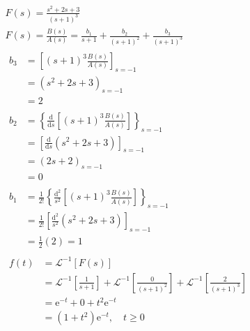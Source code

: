 \begin{gather*}
    F(s)=\frac{s^{2}+2 s+3}{(s+1)^{3}}\\
    F(s)=\frac{B(s)}{A(s)}=\frac{b_{1}}{s+1}+\frac{b_{2}}{(s+1)^{2}}+\frac{b_{3}}{(s+1)^{3}}\\
    \begin{aligned} b_{3} &=\left[(s+1)^{3} \frac{B(s)}{A(s)}\right]_{s=-1} \\ &=\left(s^{2}+2 s+3\right)_{s=-1} \\ &=2 \end{aligned}\\
    \begin{aligned} b_{2} &=\left\{\frac{\mathrm{d}}{\mathrm{d} s}\left[(s+1)^{3} \frac{B(s)}{A(s)}\right]\right\}_{s=-1} \\ &=\left[\frac{\mathrm{d}}{\mathrm{d} s}\left(s^{2}+2 s+3\right)\right]_{s=-1} \\ &=(2 s+2)_{s=-1} \\ &=0 \end{aligned}\\
    \begin{aligned} b_{1} &=\frac{1}{2 !}\left\{\frac{\mathrm{d}^{2}}{s^{2}}\left[(s+1)^{3} \frac{B(s)}{A(s)}\right]\right\}_{s=-1} \\ &=\frac{1}{2 !}\left[\frac{\mathrm{d}^{2}}{s^{2}}\left(s^{2}+2 s+3\right)\right]_{s=-1} \\ &=\frac{1}{2}(2)=1 \end{aligned}\\
    \begin{aligned} f(t) &=\mathscr{L}^{-1}[F(s)] \\ &=\mathscr{L}^{-1}\left[\frac{1}{s+1}\right]+\mathscr{L}^{-1}\left[\frac{0}{(s+1)^{2}}\right]+\mathscr{L}^{-1}\left[\frac{2}{(s+1)^{3}}\right] \\ &=\mathrm{e}^{-t}+0+t^{2} \mathrm{e}^{-t} \\ &=\left(1+t^{2}\right) \mathrm{e}^{-t}, \quad t \geq 0 \end{aligned}
\end{gather*}

